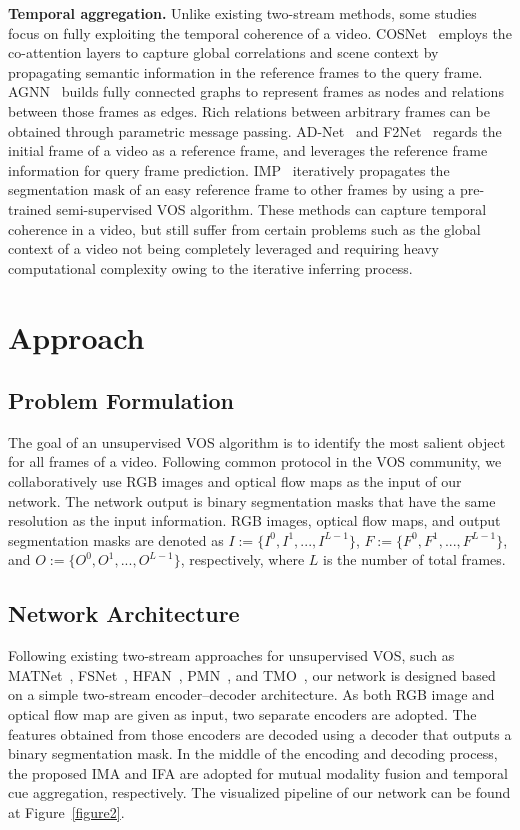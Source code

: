 \documentclass[10pt,twocolumn,letterpaper]{article}
\begin{document}
\vspace{1mm}
\noindent\textbf{Temporal aggregation.} Unlike existing two-stream methods, some studies focus on fully exploiting the temporal coherence of a video. COSNet~\cite{COSNet} employs the co-attention layers to capture global correlations and scene context by propagating semantic information in the reference frames to the query frame. AGNN~\cite{AGNN} builds fully connected graphs to represent frames as nodes and relations between those frames as edges. Rich relations between arbitrary frames can be obtained through parametric message passing. AD-Net~\cite{AD-Net} and F2Net~\cite{F2Net} regards the initial frame of a video as a reference frame, and leverages the reference frame information for query frame prediction. IMP~\cite{IMP} iteratively propagates the segmentation mask of an easy reference frame to other frames by using a pre-trained semi-supervised VOS algorithm. These methods can capture temporal coherence in a video, but still suffer from certain problems such as the global context of a video not being completely leveraged and requiring heavy computational complexity owing to the iterative inferring process. 



\section{Approach}
\subsection{Problem Formulation}
The goal of an unsupervised VOS algorithm is to identify the most salient object for all frames of a video. Following common protocol in the VOS community, we collaboratively use RGB images and optical flow maps as the input of our network. The network output is binary segmentation masks that have the same resolution as the input information. RGB images, optical flow maps, and output segmentation masks are denoted as $I := \{I^0, I^1, ..., I^{L-1}\}$, $F := \{F^0, F^1, ..., F^{L-1}\}$, and $O := \{O^0, O^1, ..., O^{L-1}\}$, respectively, where $L$ is the number of total frames.


\subsection{Network Architecture}
Following existing two-stream approaches for unsupervised VOS, such as MATNet~\cite{MATNet}, FSNet~\cite{FSNet}, HFAN~\cite{HFAN}, PMN~\cite{PMN}, and TMO~\cite{TMO}, our network is designed based on a simple two-stream encoder--decoder architecture. As both RGB image and optical flow map are given as input, two separate encoders are adopted. The features obtained from those encoders are decoded using a decoder that outputs a binary segmentation mask. In the middle of the encoding and decoding process, the proposed IMA and IFA are adopted for mutual modality fusion and temporal cue aggregation, respectively. The visualized pipeline of our network can be found at Figure~\ref{figure2}.
\end{document}
